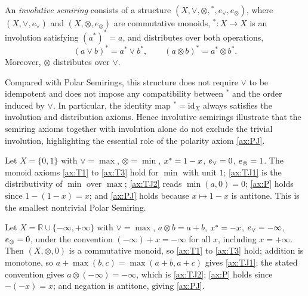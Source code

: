 \begin{example}\label{ex:involutive-semiring}
An \emph{involutive semiring} consists of a structure
$(X,\vee,\otimes,{}^{*},e_{\vee},e_{\otimes})$,
where $(X,\vee,e_{\vee})$ and $(X,\otimes,e_{\otimes})$ are commutative monoids,
${}^{*}:X\to X$ is an involution satisfying
$(a^{*})^{*}=a$,
and distributes over both operations,
\[
(a\vee b)^{*}=a^{*}\vee b^{*},\qquad
(a\otimes b)^{*}=a^{*}\otimes b^{*}.
\]
Moreover, $\otimes$ distributes over $\vee$.

Compared with Polar Semirings, this structure does not require
$\vee$ to be idempotent and does not impose any compatibility between
${}^{*}$ and the order induced by $\vee$. In particular, the identity map
${}^{*}=\mathrm{id}_{X}$ always satisfies the involution and distribution
axioms. Hence involutive semirings illustrate that the semiring axioms
together with involution alone do not exclude the trivial involution,
highlighting the essential role of the polarity axiom \eqref{ax:PJ}.
\end{example}

\begin{example}\label{ex:boolean}
Let $X = \{0,1\}$ with $\vee = \max$, $\otimes = \min$, ${x}^{*} = 1-x$,
$e_{\vee} = 0$, $e_{\otimes} = 1$. The monoid axioms \eqref{ax:T1} to \eqref{ax:T3} hold
for $\min$ with unit $1$; \eqref{ax:TJ1} is the distributivity of $\min$
over $\max$; \eqref{ax:TJ2} reads $\min(a,0)=0$; \eqref{ax:P} holds since
$1-(1-x)=x$; and \eqref{ax:PJ} holds because $x \mapsto 1-x$ is antitone.
This is the smallest nontrivial Polar Semiring.
\end{example}

\begin{example}\label{ex:tropical}
Let $X = \mathbb{R} \cup \{-\infty,+\infty\}$ with $\vee = \max$,
$a \otimes b = a+b$, ${x}^{*} = -x$, $e_{\vee} = -\infty$, $e_{\otimes} = 0$, under the
convention $(-\infty)+x = -\infty$ for all $x$, including $x = +\infty$. Then
$(X,\otimes,0)$ is a commutative monoid, so \eqref{ax:T1} to \eqref{ax:T3}
hold; addition is monotone, so $a + \max(b,c) = \max(a+b,a+c)$ gives
\eqref{ax:TJ1}; the stated convention gives $a \otimes (-\infty) = -\infty$,
which is \eqref{ax:TJ2}; \eqref{ax:P} holds since $-(-x)=x$; and negation is
antitone, giving \eqref{ax:PJ}.
\end{example}

